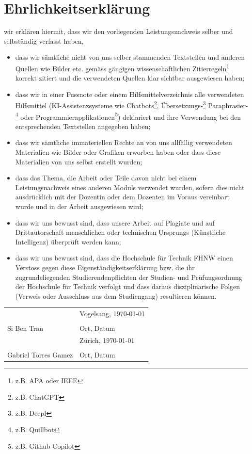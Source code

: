 \section*{Ehrlichkeitserklärung}

wir erklären hiermit, dass wir den vorliegenden Leistungsnachweis selber und selbständig verfasst haben,
\begin{itemize} 
\item dass wir sämtliche nicht von uns selber stammenden Textstellen und anderen Quellen wie Bilder etc. gemäss gängigen wissenschaftlichen Zitierregeln\footnote{z.B. APA oder IEEE} korrekt zitiert und die verwendeten Quellen klar sichtbar ausgewiesen haben; 
\item dass wir in einer Fussnote oder einem Hilfsmittelverzeichnis alle verwendeten Hilfsmittel (KI-Assistenzsysteme wie Chatbots\footnote{z.B. ChatGPT}, Übersetzungs-\footnote{z.B. Deepl} Paraphrasier-\footnote{z.B. Quillbot} oder Programmierapplikationen\footnote{z.B. Github Copilot}) deklariert und ihre Verwendung bei den entsprechenden Textstellen angegeben haben;
\item dass wir sämtliche immateriellen Rechte an von uns allfällig verwendeten Materialien wie Bilder oder Grafiken erworben haben oder dass diese Materialien von uns selbst erstellt wurden;
\item dass das Thema, die Arbeit oder Teile davon nicht bei einem Leistungsnachweis eines anderen Moduls verwendet wurden, sofern dies nicht ausdrücklich mit der Dozentin oder dem Dozenten im Voraus vereinbart wurde und in der Arbeit ausgewiesen wird; 
\item dass wir uns bewusst sind, dass unsere Arbeit auf Plagiate und auf Drittautorschaft menschlichen oder technischen Ursprungs (Künstliche Intelligenz) überprüft werden kann;
\item dass wir uns bewusst sind, dass die Hochschule für Technik FHNW einen Verstoss gegen diese Eigenständigkeitserklärung bzw. die ihr zugrundeliegenden Studierendenpflichten der Studien- und Prüfungsordnung der Hochschule für Technik verfolgt und dass daraus disziplinarische Folgen (Verweis oder Ausschluss aus dem Studiengang) resultieren können.
\end{itemize}

\vspace{1cm}

\noindent
\begin{tabular}{ll}
    &  Vogelsang, \today \\
    \hrulefill                  & \hrulefill        \\
    Si Ben Tran                 & Ort, Datum        \\[1.5cm]
    
    & Zürich, \today  \\
    \hrulefill                  & \hrulefill        \\
    Gabriel Torres Gamez        & Ort, Datum        \\[1.5cm]
\end{tabular}
